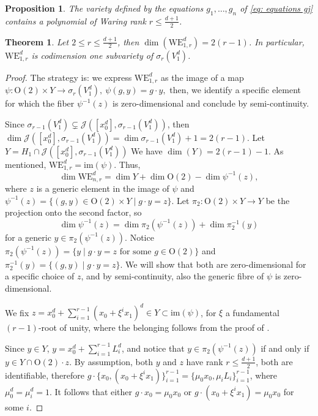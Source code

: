 \documentclass[10pt,a4paper]{amsart}
\newtheorem{proposition}{Proposition}
\newtheorem{theorem}{Theorem}
\begin{document}
\begin{proposition}\label{prop:rankrbinary}
    The variety defined by the equations $g_1,\dots,g_n$ of \cref{eq: equations gj} contains a polynomial of Waring rank $r\leq \frac{d+1}{2}$.
\end{proposition}

\begin{theorem}\label{proposition: dim WE rnc }
    Let $2\leq r\leq \frac{d+1}{2}$, then $\dim(\mathrm{WE}_{1,r}^d)=2(r-1)$. In particular, $\mathrm{WE}_{1,r}^d$ is codimension one subvariety of $\sigma_r(V_1^d)$.
\end{theorem}

\begin{proof}
    {The strategy is: we express $\mathrm{WE}^d_{1,r}$ as the image of a map 
    $
        \psi:\mathrm{O}(2)\times Y\to \sigma_r(V_1^d),\ \psi(g,y)=g\cdot y,
    $
    then, we identify a specific element for which the fiber $\psi^{-1}(z)$ is zero-dimensional and conclude by semi-continuity.}
    
    Since $\sigma_{r-1}(V_1^d)\subsetneq\mathcal J([x_0^d], \sigma_{r-1}(V_1^d))$, then $\dim \mathcal J([x_0^d], \sigma_{r-1}(V_1^d)) = \dim \sigma_{r-1}(V_1^d)+1 = 2(r-1).$ Let $Y=H_1\cap \mathcal J([x_0^d], \sigma_{r-1}(V_1^d))$ We have $\dim(Y)=2(r-1)-1$.
    As mentioned, $\mathrm{WE}_{1,r}^d=\mathrm{im}(\psi)$. Thus, $$\dim \mathrm{WE}_{n,r}^d=\dim Y+\dim \mathrm{O}(2)-\dim \psi^{-1}(z),$$ where $z$ is a generic element in the image of $\psi$ and $\psi^{-1}(z)=\{(g,y)\in \mathrm{O}(2)\times Y\mid g\cdot y=z\}$. Let $\pi_2:\mathrm{O}(2)\times Y\to Y$ be the projection onto the second factor, so $$\dim \psi^{-1}(z)=\dim \pi_2(\psi^{-1}(z))+\dim \pi_2^{-1}(y)$$ for a generic $y\in \pi_2(\psi^{-1}(z))$. Notice $\pi_2(\psi^{-1}(z))=\{y\mid g\cdot y=z \text{ for some $g\in\mathrm{O}(2)$}\}$ and $\pi_2^{-1}(y)=\{(g,y)\mid g\cdot y=z\}$. We will show that both are zero-dimensional for a specific choice of $z$, and by semi-continuity, also the generic fibre of $\psi$ is zero-dimensional. 
    
    We fix $z=x_0^d+\sum_{i=1}^{r-1}(x_0+\xi^ix_1)^d\in Y\subset \mathrm{im}(\psi)$, for $\xi$ a fundamental $(r-1)$-root of unity, where the belonging follows from the proof of .

    Since $y\in Y$, $y=x_0^d+\sum_{i=1}^{r-1}L_i^d$, and notice that $y\in \pi_2(\psi^{-1}(z))$ if and only if $y\in Y\cap \mathrm{O}(2)\cdot z$. By assumption, both $y$ and $z$ have rank $r\leq \frac{d+1}{2}$, both are identifiable, therefore $g\cdot\{ x_0,(x_0+\xi^ix_1)\}_{i=1}^{r-1}=\{\mu_0 x_0,\mu_iL_i\}_{i=1}^{r-1}$, where $\mu_0^d=\mu_i^d=1$. It follows that either $g\cdot x_0=\mu_0 x_0$ or $g\cdot (x_0+\xi^ix_1)=\mu_0x_0$ for some $i$. 


\end{proof}
\end{document}
